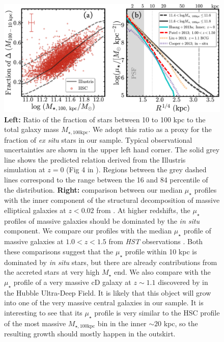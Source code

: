 \documentclass[fleqn,usenatbib]{mnras}
\def\mstar{{$M_{\star}$}}
\def\mtot{{$M_{\star,100\mathrm{kpc}}$}}
\def\mden{{$\mu_{\star}$}}
\begin{document}
     

  \begin{figure}
      \centering 
      \includegraphics[width=\textwidth]{fig/redbcg_insitu_accretion}
      \caption{
          \textbf{Left:} Ratio of the fraction of stars between 10 to 100 
          kpc to the total galaxy mass \mtot{}. 
          We adopt this ratio as a proxy for the fraction of  \textit{ex situ} stars 
          in our sample. 
          Typical observational uncertainties are shown in the upper left hand corner. 
          The solid grey line shows the predicted relation  derived from the Illustris
          simulation at $z=0$ (Fig 4 in \citealt{RodriguezGomez2016}). 
          Regions between the grey dashed lines correspond to the range between the 
          16 and 84 percentile of the distribution. 
          \textbf{Right:} comparison between our median \mden{} profiles 
          with the inner component of the structural decomposition of massive 
          elliptical galaxies at $z<0.02$ from \citet[][Cyan, solid]{Huang2013a}.
          At higher redshifts, the \mden{} profiles of massive galaxies should be 
          dominated by the  \textit{in situ}  component. 
          We compare our profiles with the median \mden{} profile of massive galaxies 
          at $1.0 < z < 1.5$ from \textit{HST} observations 
          \citet[][Red, dashed]{Patel2013}. 
          Both these comparisons suggest that the \mden{} profile within 10 kpc is 
          dominated by \textit{in situ} stars, but there are already contributions
          from the accreted stars at very high \mstar{} end. 
          We also compare with the \mden{} profile of a very massive cD galaxy at
          $z{\sim} 1.1$ discovered by \citet[][Yellow, dashed]{Liu2013} in the Hubble 
          Ultra-Deep Field. 
          It is likely that this object will grow into one of the very massive central
          galaxies in our sample.
          It is interesting to see that its \mden{} profile is very similar to the 
          HSC profile of the most massive \mtot{} bin in the inner $\sim 20$ kpc, so 
          the resulting growth should mostly happen in the outskirt. 
          }
      \label{fig:discussion_1}
  \end{figure}
\end{document}
